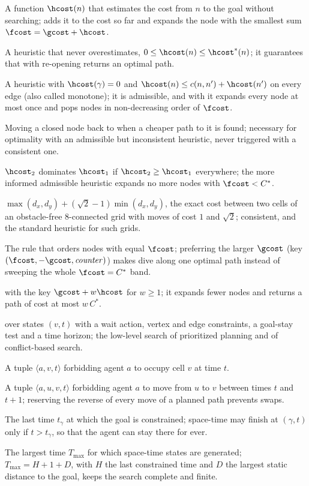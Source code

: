 \item[Heuristic] A function $\hcost(n)$ that estimates the cost from $n$ to the goal without searching; \astar adds it to the cost so far and expands the node with the smallest sum $\fcost=\gcost+\hcost$.
\item[Admissible heuristic] A heuristic that never overestimates, $0\le\hcost(n)\le\hcost^*(n)$; it guarantees that \astar with re-opening returns an optimal path.
\item[Consistent heuristic] A heuristic with $\hcost(\gamma)=0$ and $\hcost(n)\le c(n,n')+\hcost(n')$ on every edge (also called monotone); it is admissible, and with it \astar expands every node at most once and pops nodes in non-decreasing order of $\fcost$.
\item[Re-opening] Moving a closed node back to \Open when a cheaper path to it is found; necessary for optimality with an admissible but inconsistent heuristic, never triggered with a consistent one.
\item[Dominance] $\hcost_2$ dominates $\hcost_1$ if $\hcost_2\ge\hcost_1$ everywhere; the more informed admissible heuristic expands no more nodes with $\fcost<C^*$.
\item[Octile distance] $\max(d_x,d_y)+(\sqrt2-1)\min(d_x,d_y)$, the exact cost between two cells of an obstacle-free 8-connected grid with moves of cost $1$ and $\sqrt2$; consistent, and the standard heuristic for such grids.
\item[Tie-breaking] The rule that orders nodes with equal $\fcost$; preferring the larger $\gcost$ (key $(\fcost,-\gcost,\mathit{counter})$) makes \astar dive along one optimal path instead of sweeping the whole $\fcost=C^*$ band.
\item[Weighted A*] \astar with the key $\gcost+w\hcost$ for $w\ge1$; it expands fewer nodes and returns a path of cost at most $w\,C^*$.
\item[Space-time A*] \astar over states $(v,t)$ with a wait action, vertex and edge constraints, a goal-stay test and a time horizon; the low-level search of prioritized planning and of conflict-based search.
\item[Vertex constraint] A tuple $\langle a,v,t\rangle$ forbidding agent $a$ to occupy cell $v$ at time $t$.
\item[Edge constraint] A tuple $\langle a,u,v,t\rangle$ forbidding agent $a$ to move from $u$ to $v$ between times $t$ and $t+1$; reserving the reverse of every move of a planned path prevents swaps.
\item[Goal-stay time] The last time $t_\gamma$ at which the goal is constrained; space-time \astar may finish at $(\gamma,t)$ only if $t>t_\gamma$, so that the agent can stay there for ever.
\item[Time horizon] The largest time $T_{\max}$ for which space-time states are generated; $T_{\max}=H+1+D$, with $H$ the last constrained time and $D$ the largest static distance to the goal, keeps the search complete and finite.
